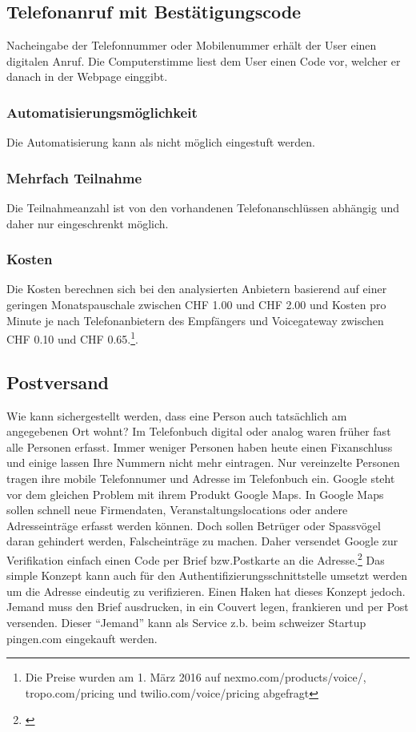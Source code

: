 \subsection{Telefonanruf mit
Bestätigungscode}\label{telefonanruf-mit-bestuxe4tigungscode}

Nacheingabe der Telefonnummer oder Mobilenummer erhält der User einen
digitalen Anruf. Die Computerstimme liest dem User einen Code vor,
welcher er danach in der Webpage einggibt.

\subsubsection{Automatisierungsmöglichkeit}\label{automatisierungsmuxf6glichkeit-4}

Die Automatisierung kann als nicht möglich eingestuft werden.

\subsubsection{Mehrfach Teilnahme}\label{mehrfach-teilnahme}

Die Teilnahmeanzahl ist von den vorhandenen Telefonanschlüssen abhängig
und daher nur eingeschrenkt möglich.

\subsubsection{Kosten}\label{kosten-5}

Die Kosten berechnen sich bei den analysierten Anbietern basierend auf
einer geringen Monatspauschale zwischen CHF 1.00 und CHF 2.00 und Kosten
pro Minute je nach Telefonanbietern des Empfängers und Voicegateway
zwischen CHF 0.10 und CHF 0.65.\footnote{Die Preise wurden am 1. März
  2016 auf nexmo.com/products/voice/, tropo.com/pricing und
  twilio.com/voice/pricing abgefragt}.

\subsection{Postversand}\label{postversand}

Wie kann sichergestellt werden, dass eine Person auch tatsächlich am
angegebenen Ort wohnt? Im Telefonbuch digital oder analog waren früher
fast alle Personen erfasst. Immer weniger Personen haben heute einen
Fixanschluss und einige lassen Ihre Nummern nicht mehr eintragen. Nur
vereinzelte Personen tragen ihre mobile Telefonnumer und Adresse im
Telefonbuch ein. Google steht vor dem gleichen Problem mit ihrem Produkt
Google Maps. In Google Maps sollen schnell neue Firmendaten,
Veranstaltungslocations oder andere Adresseinträge erfasst werden
können. Doch sollen Betrüger oder Spassvögel daran gehindert werden,
Falscheinträge zu machen. Daher versendet Google zur Verifikation
einfach einen Code per Brief bzw.Postkarte an die Adresse.\footnote{\autocite{googlebusiness}}
Das simple Konzept kann auch für den Authentifizierungsschnittstelle
umsetzt werden um die Adresse eindeutig zu verifizieren. Einen Haken hat
dieses Konzept jedoch. Jemand muss den Brief ausdrucken, in ein Couvert
legen, frankieren und per Post versenden. Dieser ``Jemand'' kann als
Service z.b. beim schweizer Startup pingen.com eingekauft werden.

